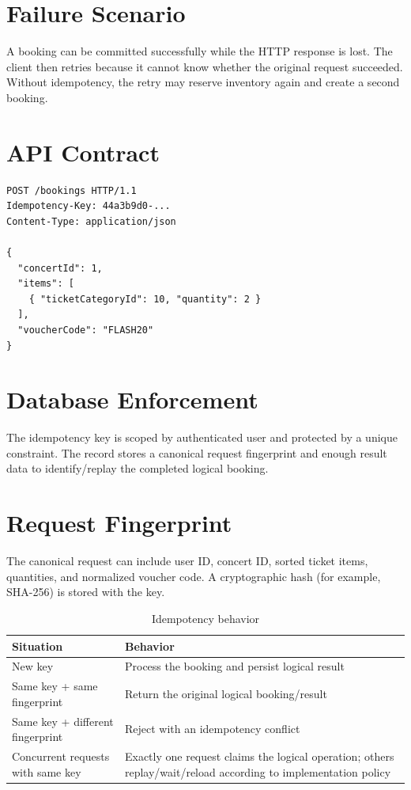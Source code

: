 \section{Failure Scenario}
A booking can be committed successfully while the HTTP response is lost. The client then retries because it cannot know whether the original request succeeded. Without idempotency, the retry may reserve inventory again and create a second booking.

\section{API Contract}
\begin{lstlisting}[language=HTTP,caption={Idempotent booking request}]
POST /bookings HTTP/1.1
Idempotency-Key: 44a3b9d0-...
Content-Type: application/json

{
  "concertId": 1,
  "items": [
    { "ticketCategoryId": 10, "quantity": 2 }
  ],
  "voucherCode": "FLASH20"
}
\end{lstlisting}

\section{Database Enforcement}
The idempotency key is scoped by authenticated user and protected by a unique constraint. The record stores a canonical request fingerprint and enough result data to identify/replay the completed logical booking.

\section{Request Fingerprint}
The canonical request can include user ID, concert ID, sorted ticket items, quantities, and normalized voucher code. A cryptographic hash (for example, SHA-256) is stored with the key.

\begin{table}[H]
\centering
\caption{Idempotency behavior}
\begin{tabularx}{\textwidth}{p{}Y}
\toprule
\textbf{Situation} & \textbf{Behavior} \\
\midrule
New key & Process the booking and persist logical result \\
Same key + same fingerprint & Return the original logical booking/result \\
Same key + different fingerprint & Reject with an idempotency conflict \\
Concurrent requests with same key & Exactly one request claims the logical operation; others replay/wait/reload according to implementation policy \\
\bottomrule
\end{tabularx}
\end{table}

